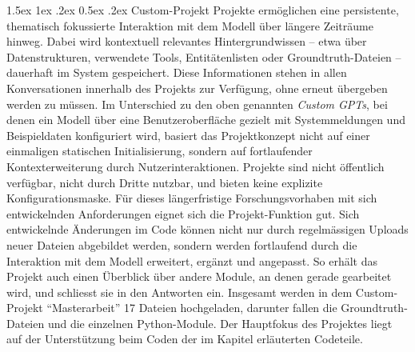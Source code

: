 \documentclass[12pt, a4paper, ngerman, bidi=default]{article}
\makeatletter
\let\oldparagraph\paragraph%
\renewcommand{\paragraph}{
    \@ifstar%
      \xxxParagraphStar%
      \xxxParagraphNoStar%
 }
\newcommand{\xxxParagraphStar}[1]{\oldparagraph*{#1}\mbox{}}
\newcommand{\xxxParagraphNoStar}[1]{\oldparagraph{#1}\mbox{}}
\renewcommand\paragraph{\@startsection{paragraph}{4}{0em}%
  {1.5ex \@plus1ex \@minus.2ex}%
  {0.5ex \@plus.2ex}%
  {\normalfont\normalsize\bfseries\itshape}}
\makeatother
\begin{document}
\paragraph{Custom-Projekt}
Projekte ermöglichen eine persistente, thematisch fokussierte Interaktion mit dem Modell über längere Zeiträume hinweg. Dabei wird kontextuell relevantes Hintergrundwissen – etwa über Datenstrukturen, verwendete Tools, Entitätenlisten oder Groundtruth-Dateien – dauerhaft im System gespeichert. Diese Informationen stehen in allen Konversationen innerhalb des Projekts zur Verfügung, ohne erneut übergeben werden zu müssen. Im Unterschied zu den oben genannten \textit{Custom GPTs}, bei denen ein Modell über eine Benutzeroberfläche gezielt mit Systemmeldungen und Beispieldaten konfiguriert wird, basiert das Projektkonzept nicht auf einer einmaligen statischen Initialisierung, sondern auf fortlaufender Kontexterweiterung durch Nutzerinteraktionen. Projekte sind nicht öffentlich verfügbar, nicht durch Dritte nutzbar, und bieten keine explizite Konfigurationsmaske. 
Für dieses längerfristige Forschungsvorhaben mit sich entwickelnden Anforderungen eignet sich die Projekt-Funktion gut. Sich entwickelnde Änderungen im Code können nicht nur durch regelmässigen Uploads neuer Dateien abgebildet werden, sondern werden fortlaufend durch die Interaktion mit dem Modell erweitert, ergänzt und angepasst. So erhält das Projekt auch einen Überblick über andere Module, an denen gerade gearbeitet wird, und schliesst sie  in den Antworten ein. Insgesamt werden in dem Custom-Projekt \enquote{Masterarbeit} 17 Dateien hochgeladen, darunter fallen die Groundtruth-Dateien und die einzelnen Python-Module. Der Hauptfokus des Projektes liegt auf der Unterstützung beim Coden der im Kapitel  erläuterten Codeteile.
\end{document}

